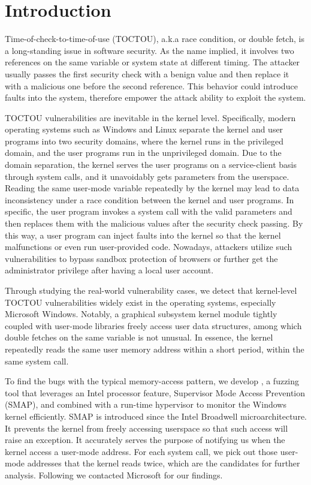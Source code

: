 
\section{Introduction}
\label{sec:ktoctou-introduction}

Time-of-check-to-time-of-use (TOCTOU), a.k.a race condition, or double fetch, is a long-standing issue in software security. As the name implied, it involves two references on the same variable or system state at different timing. The attacker usually passes the first security check with a benign value and then replace it with a malicious one before the second reference. This behavior could introduce faults into the system, therefore empower the attack ability to exploit the system.

TOCTOU vulnerabilities are inevitable in the kernel level. Specifically, modern operating systems such as Windows and Linux separate the kernel and user programs into two security domains,  where the kernel runs in the privileged domain, and the user programs run in the unprivileged domain. Due to the domain separation, the kernel serves the user programs on a service-client basis through system calls, and it unavoidably gets parameters from the userspace. Reading the same user-mode variable repeatedly by the kernel may lead to data inconsistency under a race condition between the kernel and user programs. In specific, the user program invokes a system call with the valid parameters and then replaces them with the malicious values after the security check passing. By this way, a user program can inject faults into the kernel so that the kernel malfunctions or even run user-provided code. Nowadays, attackers utilize such vulnerabilities to bypass sandbox protection of browsers or further get the administrator privilege after having a local user account.

Through studying the real-world vulnerability cases,  we detect that kernel-level TOCTOU vulnerabilities widely exist in the operating systems, especially Microsoft Windows. Notably, a graphical subsystem kernel module tightly coupled with user-mode libraries freely access user data structures, among which double fetches on the same variable is not unusual. In essence, the kernel repeatedly reads the same user memory address within a short period, within the same system call.

To find the bugs with the typical memory-access pattern, we develop \toolname, a fuzzing tool that leverages an Intel processor feature, Supervisor Mode Access Prevention (SMAP), and combined with a run-time hypervisor to monitor the Windows kernel efficiently. SMAP is introduced since the Intel Broadwell microarchitecture. It prevents the kernel from freely accessing userspace so that such access will raise an exception. It accurately serves the purpose of notifying us when the kernel access a user-mode address. For each system call, we pick out those user-mode addresses that the kernel reads twice, which are the candidates for further analysis. Following we contacted Microsoft for our findings.

